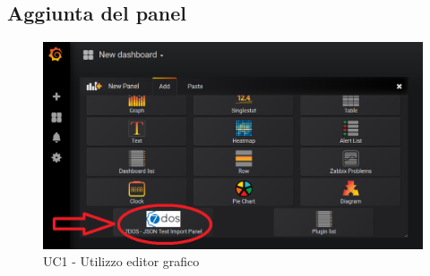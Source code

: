 \subsection{Aggiunta del panel}
\begin{figure} [H]
	\centering
	\includegraphics[scale=0.8]{Img/aggiuntapanel} 
	\caption{UC1 - Utilizzo editor grafico} \label{} 
\end{figure} 